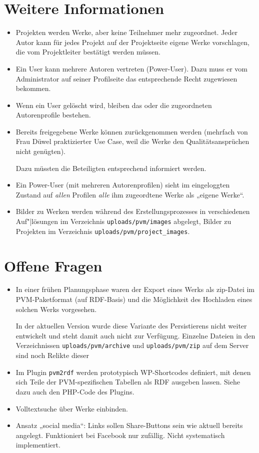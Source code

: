 \documentclass[a4paper,11pt]{article}
\begin{document}
\section{Weitere Informationen}

\begin{itemize}\itemsep0pt
\item Projekten werden Werke, aber keine Teilnehmer mehr zugeordnet. Jeder
  Autor kann für jedes Projekt auf der Projektseite eigene Werke vorschlagen,
  die vom Projektleiter bestätigt werden müssen.
\item Ein User kann mehrere Autoren vertreten (Power-User). Dazu muss er vom
  Administrator auf seiner Profilseite das entsprechende Recht zugewiesen
  bekommen. 
\item Wenn ein User gelöscht wird, bleiben das oder die zugeordneten
  Autorenprofile bestehen.
\item Bereits freigegebene Werke können zurückgenommen werden (mehrfach von
  Frau Düwel praktizierter Use Case, weil die Werke den Qualitätsansprüchen
  nicht genügten). 

  Dazu müssten die Beteiligten entsprechend informiert werden.
\item Ein Power-User (mit mehreren Autorenprofilen) sieht im eingeloggten
  Zustand auf \emph{allen} Profilen \emph{alle} ihm zugeordtene Werke als
  „eigene Werke“.
\item Bilder zu Werken werden während des Erstellungsprozesses in verschiedenen
  Auf"|lösungen im Verzeichnis \texttt{uploads/pvm/images} abgelegt, Bilder zu
  Projekten im Verzeichnis \texttt{uploads/pvm/project\_images}.
\end{itemize}

\section{Offene Fragen}
 
\begin{itemize}\itemsep0pt
\item In einer frühen Planungsphase waren der Export eines Werks als zip-Datei
  im PVM-Paketformat (auf RDF-Basis) und die Möglichkeit des Hochladen eines
  solchen Werks vorgesehen.

  In der aktuellen Version wurde diese Variante des Persistierens nicht weiter
  entwickelt und steht damit auch nicht zur Verfügung.  Einzelne Dateien in den
  Verzeichnissen \texttt{uploads/pvm/archive} und \texttt{uploads/pvm/zip} auf
  dem Server sind noch Relikte dieser 

\item Im Plugin \texttt{pvm2rdf} werden prototypisch WP-Shortcodes definiert,
  mit denen sich Teile der PVM-spezifischen Tabellen als RDF ausgeben lassen.
  Siehe dazu auch den PHP-Code des Plugins. 

\item Volltextsuche über Werke einbinden.

\item Ansatz „social media“: Links sollen Share-Buttons sein wie aktuell
  bereits angelegt. Funktioniert bei Facebook nur zufällig. Nicht systematisch
  implementiert.
\end{itemize}
\end{document}
